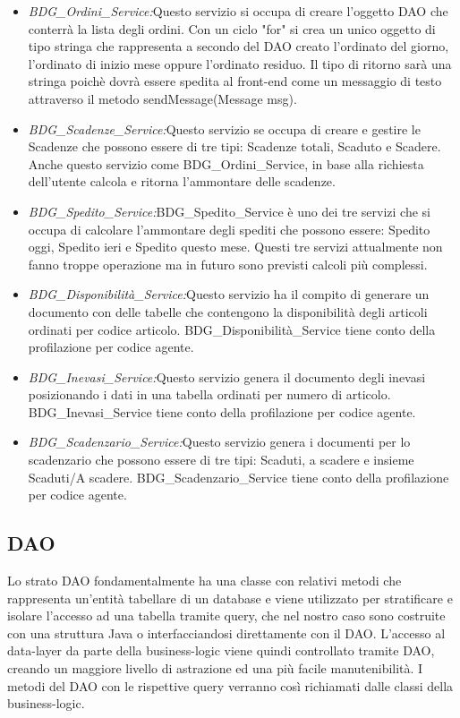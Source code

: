 \begin{itemize}

\item \textit{BDG\_Ordini\_Service:}Questo servizio si occupa di creare l'oggetto DAO che conterrà la lista degli ordini. Con un ciclo "for" si crea un unico oggetto di tipo stringa che rappresenta a secondo del DAO creato l'ordinato del giorno, l'ordinato di inizio mese oppure l'ordinato residuo. Il tipo di ritorno sarà una stringa poichè dovrà essere spedita al front-end come un messaggio di testo attraverso il metodo sendMessage(Message msg).

\item \textit{BDG\_Scadenze\_Service:}Questo servizio se occupa di creare e gestire le Scadenze che possono essere di tre tipi: Scadenze totali, Scaduto e Scadere. Anche questo servizio come BDG\_Ordini\_Service, in base alla richiesta dell'utente calcola e ritorna l'ammontare delle scadenze.

\item \textit{BDG\_Spedito\_Service:}BDG\_Spedito\_Service è uno dei tre servizi che si occupa di calcolare l'ammontare degli spediti che possono essere: Spedito oggi, Spedito ieri e Spedito questo mese. Questi tre servizi attualmente non fanno troppe operazione ma in futuro sono previsti calcoli più complessi.

\item \textit{BDG\_Disponibilità\_Service:}Questo servizio ha il compito di generare un documento con delle tabelle che contengono  la disponibilità degli articoli ordinati per codice articolo. BDG\_Disponibilità\_Service tiene conto della profilazione per codice agente.

\item \textit{BDG\_Inevasi\_Service:}Questo servizio genera il documento degli inevasi posizionando i dati in una tabella ordinati per numero di articolo. BDG\_Inevasi\_Service tiene conto della profilazione per codice agente.

\item \textit{BDG\_Scadenzario\_Service:}Questo servizio genera i documenti per lo scadenzario che possono essere di tre tipi: Scaduti, a scadere e insieme Scaduti/A scadere. BDG\_Scadenzario\_Service tiene conto della profilazione per codice agente.

\end{itemize}

\subsection{DAO}
Lo strato \gls{DAO} fondamentalmente ha una classe con relativi metodi che rappresenta
un'entità tabellare di un database e viene utilizzato per stratificare e isolare l'accesso
ad una tabella tramite query, che nel nostro caso sono costruite con una struttura Java
o interfacciandosi direttamente con il DAO. L'accesso al \gls{data-layer} da parte della
business-logic viene quindi controllato tramite DAO, creando un maggiore livello di
astrazione ed una più facile manutenibilità. I metodi del DAO con le rispettive query
verranno così richiamati dalle classi della business-logic.



